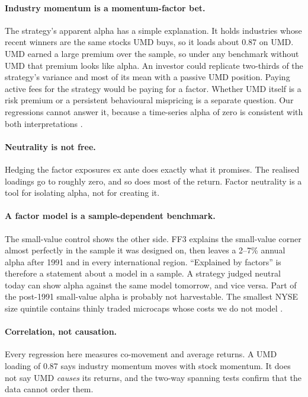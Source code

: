 \documentclass[11pt]{article}
\begin{document}
\paragraph{Industry momentum is a momentum-factor bet.} The strategy's apparent alpha has a simple explanation. It holds industries whose recent winners are the same stocks UMD buys, so it loads about 0.87 on UMD. UMD earned a large premium over the sample, so under any benchmark without UMD that premium looks like alpha. An investor could replicate two-thirds of the strategy's variance and most of its mean with a passive UMD position. Paying active fees for the strategy would be paying for a factor. Whether UMD itself is a risk premium or a persistent behavioural mispricing is a separate question. Our regressions cannot answer it, because a time-series alpha of zero is consistent with both interpretations \citep{DT1997}.

\paragraph{Neutrality is not free.} Hedging the factor exposures ex ante does exactly what it promises. The realised loadings go to roughly zero, and so does most of the return. Factor neutrality is a tool for isolating alpha, not for creating it.

\paragraph{A factor model is a sample-dependent benchmark.} The small-value control shows the other side. FF3 explains the small-value corner almost perfectly in the sample it was designed on, then leaves a 2--7\% annual alpha after 1991 and in every international region. ``Explained by factors'' is therefore a statement about a model in a sample. A strategy judged neutral today can show alpha against the same model tomorrow, and vice versa. Part of the post-1991 small-value alpha is probably not harvestable. The smallest NYSE size quintile contains thinly traded microcaps whose costs we do not model \citep{NMV2016}.

\paragraph{Correlation, not causation.} Every regression here measures co-movement and average returns. A UMD loading of 0.87 says industry momentum moves with stock momentum. It does not say UMD \emph{causes} its returns, and the two-way spanning tests confirm that the data cannot order them.
\end{document}
